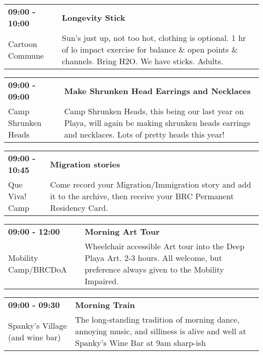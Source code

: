 \begin{tabular}{ p{1in} p{2.2in} }
    \textbf{09:00 - 10:00} & \textbf{Longevity Stick} \\
    Cartoon Commune \newline  & Sun's just up, not too hot, clothing is optional. 1 hr of lo impact exercise for balance \& open points \& channels. Bring H2O. We have sticks. Adults. \\
    \hline 
\end{tabular}
    
\begin{tabular}{ p{1in} p{2.2in} }
    \textbf{09:00 - 09:00} & \textbf{Make Shrunken Head Earrings and Necklaces} \\
    Camp Shrunken Heads \newline  & Camp Shrunken Heads, this being our last year on Playa, will again be making shrunken heads earrings and necklaces. Lots of pretty heads this year! \\
    \hline 
\end{tabular}
    
\begin{tabular}{ p{1in} p{2.2in} }
    \textbf{09:00 - 10:45} & \textbf{Migration stories} \\
    Que Viva! Camp \newline  & Come record your Migration/Immigration story and add it to the archive, then receive your BRC Permanent Residency Card. \\
    \hline 
\end{tabular}
    
\begin{tabular}{ p{1in} p{2.2in} }
    \textbf{09:00 - 12:00} & \textbf{Morning Art Tour} \\
    Mobility Camp/BRCDoA \newline  & Wheelchair accessible Art tour into the Deep Playa Art.
2-3 hours. All welcome, but preference always given to the Mobility Impaired. \\
    \hline 
\end{tabular}
    
\begin{tabular}{ p{1in} p{2.2in} }
    \textbf{09:00 - 09:30} & \textbf{Morning Train} \\
    Spanky's Village (and wine bar) \newline  & The long-standing tradition of morning dance, annoying music, and silliness is alive and well at Spanky's Wine Bar at 9am sharp-ish \\
    \hline 
\end{tabular}
    
